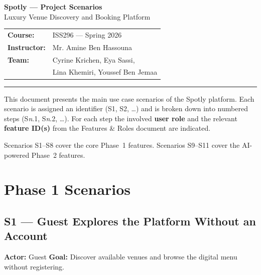 \documentclass[12pt,a4paper]{article}
\begin{document}
\begin{center}
    {\LARGE\bfseries Spotly --- Project Scenarios}\\[0.5em]
    {\large Luxury Venue Discovery and Booking Platform}\\[1em]
    \begin{tabular}{ll}
        \textbf{Course:}      & ISS296 --- Spring 2026 \\
        \textbf{Instructor:}  & Mr. Amine Ben Hassouna \\
        \textbf{Team:}        & Cyrine Krichen, Eya Sassi, \\
                              & Lina Khemiri, Youssef Ben Jemaa \\
    \end{tabular}
\end{center}

\vspace{1.5em}
\hrule
\vspace{1.5em}

This document presents the main use case scenarios of the Spotly platform.
Each scenario is assigned an identifier (S1, S2, \ldots) and is broken down
into numbered steps (S\textit{n}.1, S\textit{n}.2, \ldots). For each step
the involved \textbf{user role} and the relevant \textbf{feature ID(s)} from
the Features \& Roles document are indicated.

Scenarios S1--S8 cover the core Phase~1 features. Scenarios S9--S11 cover
the AI-powered Phase~2 features.

\section{Phase 1 Scenarios}

\subsection*{S1 --- Guest Explores the Platform Without an Account}
\begin{mdframed}[style=scenariobox]
\textbf{Actor:} Guest \quad
\textbf{Goal:} Discover available venues and browse the digital menu
without registering.
\end{mdframed}
\end{document}
